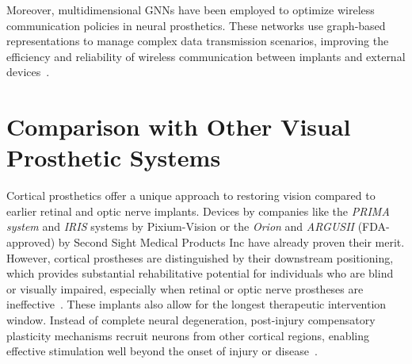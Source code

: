 \documentclass[twocolumn,10pt]{article}
\begin{document}
Moreover, multidimensional GNNs have been employed to optimize wireless
communication policies in neural prosthetics. These networks use graph-based
representations to manage complex data transmission scenarios, improving the
efficiency and reliability of wireless communication between implants and
external devices~\parencite{liuMultidimensionalGraphNeural2024}.

\section*{Comparison with Other Visual Prosthetic Systems}\label{sec:comparison}
Cortical prosthetics offer a unique approach to restoring vision compared to
earlier retinal and optic nerve implants. Devices by companies like the
\textit{PRIMA system} and \textit{IRIS} systems by Pixium-Vision or the
\textit{Orion} and \textit{ARGUSII} (FDA-approved) by Second Sight Medical
Products Inc have already proven their merit. However, cortical prostheses are
distinguished by their downstream positioning, which provides substantial
rehabilitative potential for individuals who are blind or visually impaired,
especially when retinal or optic nerve prostheses are
ineffective~\parencite{tzekovGabelEdArtificial2020}. These implants also allow
for the longest therapeutic intervention window. Instead of complete neural
degeneration, post-injury compensatory plasticity mechanisms recruit neurons
from other cortical regions, enabling effective stimulation well beyond the
onset of injury or disease~\parencite{beyelerLearningSeeAgain2017}.
\end{document}
